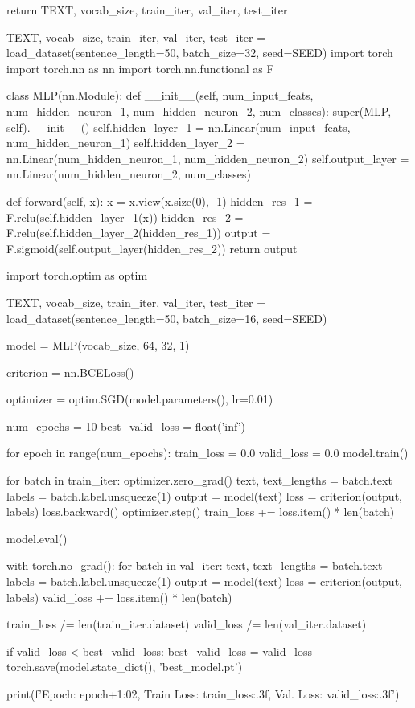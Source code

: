 \documentclass[11pt]{article}
\begin{document}
\begin{python}
  return TEXT, vocab_size, train_iter, val_iter, test_iter

   TEXT, vocab_size, train_iter, val_iter, test_iter = load_dataset(sentence_length=50, batch_size=32, seed=SEED)
import torch
import torch.nn as nn
import torch.nn.functional as F

class MLP(nn.Module):
    def __init__(self, num_input_feats, num_hidden_neuron_1, num_hidden_neuron_2, num_classes):
        super(MLP, self).__init__()
        self.hidden_layer_1 = nn.Linear(num_input_feats, num_hidden_neuron_1)
        self.hidden_layer_2 = nn.Linear(num_hidden_neuron_1, num_hidden_neuron_2)
        self.output_layer = nn.Linear(num_hidden_neuron_2, num_classes)
        
    def forward(self, x):
        x = x.view(x.size(0), -1)
        hidden_res_1 = F.relu(self.hidden_layer_1(x))
        hidden_res_2 = F.relu(self.hidden_layer_2(hidden_res_1))
        output = F.sigmoid(self.output_layer(hidden_res_2))
        return output

    import torch.optim as optim


TEXT, vocab_size, train_iter, val_iter, test_iter = load_dataset(sentence_length=50, batch_size=16, seed=SEED)

model = MLP(vocab_size, 64, 32, 1)

criterion = nn.BCELoss()

optimizer = optim.SGD(model.parameters(), lr=0.01)

num_epochs = 10
best_valid_loss = float('inf')

for epoch in range(num_epochs):
    train_loss = 0.0
    valid_loss = 0.0
    model.train()
    
    for batch in train_iter:
        optimizer.zero_grad()
        text, text_lengths = batch.text
        labels = batch.label.unsqueeze(1)
        output = model(text)
        loss = criterion(output, labels)
        loss.backward()
        optimizer.step()
        train_loss += loss.item() * len(batch)
    
    model.eval()
    
    with torch.no_grad():
        for batch in val_iter:
            text, text_lengths = batch.text
            labels = batch.label.unsqueeze(1)
            output = model(text)
            loss = criterion(output, labels)
            valid_loss += loss.item() * len(batch)
    
    train_loss /= len(train_iter.dataset)
    valid_loss /= len(val_iter.dataset)
    
    if valid_loss < best_valid_loss:
        best_valid_loss = valid_loss
        torch.save(model.state_dict(), 'best_model.pt')
    
    print(f'Epoch: {epoch+1:02}, Train Loss: {train_loss:.3f}, Val. Loss: {valid_loss:.3f}')



\end{python}
\end{document}
